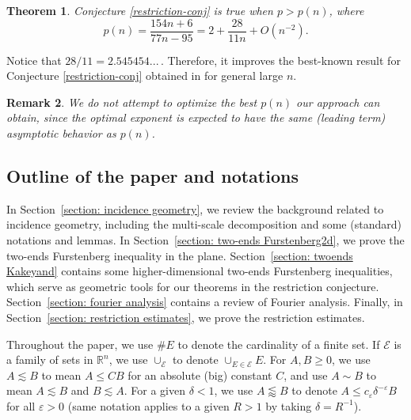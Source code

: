 \documentclass{amsart}
\numberwithin{equation}{section}
\newtheorem{theorem}{Theorem}[section]
\newtheorem{remark}[theorem]{Remark}
\newcommand{\de}{\delta}
\newcommand{\e}{\varepsilon}
\newcommand{\ce}{\mathcal E}
\newcommand{\ZR}{\mathbb{R}}
\begin{document}
\begin{theorem}
\label{main-high-d}
Conjecture \ref{restriction-conj} is true when $p>p(n)$, where
\begin{equation}
\label{p(n)}
    p(n)=\frac{154n+6}{77n-95}=2+\frac{28}{11n}+O(n^{-2}).
\end{equation}
\end{theorem}

Notice that $28/11=2.545454...\,$. Therefore, it improves the best-known result for Conjecture \ref{restriction-conj} obtained in \cite{GuoWZ} for general large $n$.
\begin{remark}
\rm

We do not attempt to optimize the best $p(n)$ our approach can obtain, since the optimal exponent is expected to have the same (leading term) asymptotic behavior as $p(n)$. 

\end{remark}

\medskip

\subsection{Outline of the paper and notations}

In Section~\ref{section: incidence geometry}, we review the background related to incidence geometry, including the multi-scale decomposition and some (standard) notations and lemmas.
In Section~\ref{section: two-ends Furstenberg2d}, we prove the two-ends Furstenberg inequality in the plane.
Section~\ref{section: twoends Kakeyand} contains some higher-dimensional two-ends Furstenberg inequalities, which serve as geometric tools for our theorems in the restriction conjecture.
Section~\ref{section: fourier analysis} contains a review of Fourier analysis.
Finally, in Section~\ref{section: restriction estimates}, we prove the restriction estimates.


\bigskip

 Throughout the paper, we use $\# E$ to denote the cardinality of a finite set.
If $\ce$ is a family of sets in $\ZR^n$, we use $\cup_\ce$ to denote $\cup_{E\in\ce}E$.
For $A,B\geq 0$, we use $A\lesssim B$ to mean $A\leq CB$ for an absolute (big) constant $C$, and use $A\sim B$ to mean $A\lesssim B$ and $B\lesssim A$.
For a given $\de<1$, we use $ A \lessapprox B$ to denote $A\leq c_\e\de^{-\e} B$ for all $\e>0$ (same notation applies to a given $R>1$ by taking $\de=R^{-1}$). 


\bigskip
\end{document}
